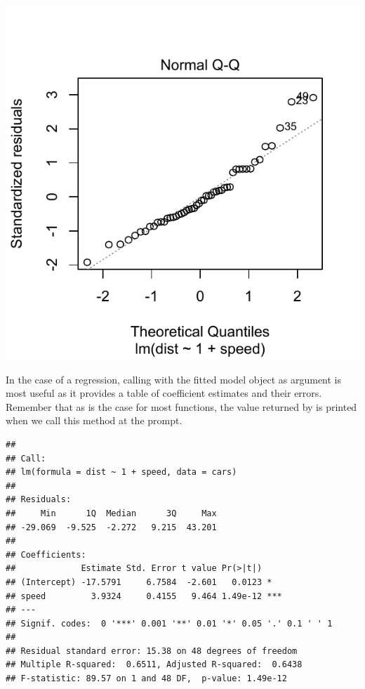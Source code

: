 \documentclass[krantz2]{krantz}\usepackage{knitr}
\begin{document}
\begin{knitrout}\footnotesize
{}\color{fgcolor}\begin{kframe}
\begin{alltt}
  \hlstd{=} \hlstd{)}
\end{alltt}
\end{kframe}

{\centering \includegraphics[width=.54\textwidth]{figure/pos-models-1a-1}

}



\end{knitrout}

In the case of a regression, calling  with the fitted model object as argument is most useful as it provides a table of coefficient estimates and their errors. Remember that as is the case for most \Rlang functions, the value returned by  is printed when we call this method at the \Rlang prompt.

\begin{knitrout}\footnotesize
{}\color{fgcolor}\begin{kframe}
\begin{alltt}
\end{alltt}
\begin{verbatim}
##
## Call:
## lm(formula = dist ~ 1 + speed, data = cars)
##
## Residuals:
##     Min      1Q  Median      3Q     Max
## -29.069  -9.525  -2.272   9.215  43.201
##
## Coefficients:
##             Estimate Std. Error t value Pr(>|t|)
## (Intercept) -17.5791     6.7584  -2.601   0.0123 *
## speed         3.9324     0.4155   9.464 1.49e-12 ***
## ---
## Signif. codes:  0 '***' 0.001 '**' 0.01 '*' 0.05 '.' 0.1 ' ' 1
##
## Residual standard error: 15.38 on 48 degrees of freedom
## Multiple R-squared:  0.6511,	Adjusted R-squared:  0.6438
## F-statistic: 89.57 on 1 and 48 DF,  p-value: 1.49e-12
\end{verbatim}
\end{kframe}
\end{knitrout}
\end{document}
